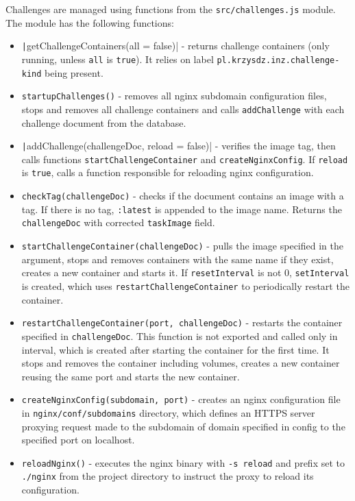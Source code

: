 Challenges are managed using functions from the \texttt{src/challenges.js} module. The module has the following functions:
\begin{itemize}
    \item \texttt|getChallengeContainers(all = false)| - returns challenge containers (only running, unless \texttt{all} is \texttt{true}). It relies on label \texttt{pl.krzysdz.inz.challenge-kind} being present.
    \item \texttt{startupChallenges()} - removes all nginx subdomain configuration files, stops and removes all challenge containers and calls \texttt{addChallenge} with each challenge document from the database.
    \item \texttt|addChallenge(challengeDoc, reload = false)| - verifies the image tag, then calls functions \texttt{startChallengeContainer} and \texttt{createNginxConfig}. If \texttt{reload} is \texttt{true}, calls a function responsible for reloading nginx configuration.
    \item \texttt{checkTag(challengeDoc)} - checks if the document contains an image with a tag. If there is no tag, \texttt{:latest} is appended to the image name. Returns the \texttt{challengeDoc} with corrected \texttt{taskImage} field.
    \item \texttt{startChallengeContainer(challengeDoc)} - pulls the image specified in the argument, stops and removes containers with the same name if they exist, creates a new container and starts it. If \texttt{resetInterval} is not 0, \texttt{setInterval} is created, which uses \texttt{restartChallengeContainer} to periodically restart the container.
    \item \texttt{restartChallengeContainer(port, challengeDoc)} - restarts the container specified in \texttt{challengeDoc}. This function is not exported and called only in interval, which is created after starting the container for the first time. It stops and removes the container including volumes, creates a new container reusing the same port and starts the new container.
    \item \texttt{createNginxConfig(subdomain, port)} - creates an nginx configuration file in \texttt{nginx/conf/subdomains} directory, which defines an HTTPS server proxying request made to the subdomain of domain specified in config to the specified port on localhost.
    \item \texttt{reloadNginx()} - executes the nginx binary with \texttt{-s reload} and prefix set to \texttt{./nginx} from the project directory to instruct the proxy to reload its configuration.
\end{itemize}

